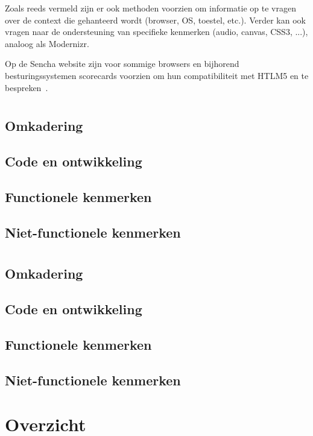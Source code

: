 Zoals reeds vermeld zijn er ook methoden voorzien om informatie op te vragen over de context die gehanteerd wordt (browser, OS, toestel, etc.).  
Verder kan \st{} ook vragen naar de ondersteuning van specifieke kenmerken (audio,  canvas,  CSS3, ...),  analoog als Modernizr.  

Op de Sencha website zijn voor sommige browsers en bijhorend besturingssystemen scorecards voorzien om hun compatibiliteit met HTLM5 en \st{} te bespreken~\cite{Inc.}.


\section{\kendo}
\label{sec:raamwerk-kendo}

\subsection{Omkadering}
\subsection{Code en ontwikkeling}
\subsection{Functionele kenmerken}
\subsection{Niet-functionele kenmerken}

\section{\lungo}
\label{sec:raamwerk-lungo}

\subsection{Omkadering}
\subsection{Code en ontwikkeling}
\subsection{Functionele kenmerken}
\subsection{Niet-functionele kenmerken}

\section{Overzicht}
\label{sec:raamwerken-overzicht}
